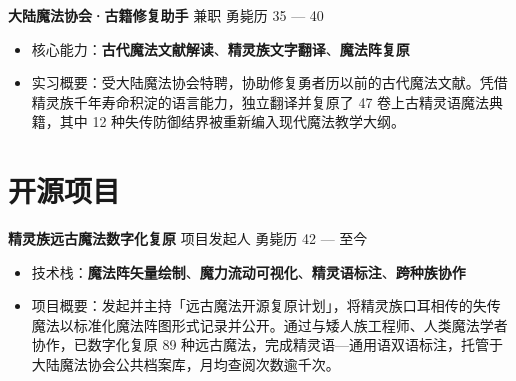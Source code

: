 \documentclass[11pt,a4paper]{article}
\newcommand*{\boldtext}[1]{{\bfseries #1}}
\newcommand{\globalIconSize}{12pt}
\newcommand{\secicon}[1]{{\color{globalIconColor}\fontsize{\globalIconSize}{\globalIconSize}\selectfont #1}}
\begin{document}
\vspace{0.8em}
\boldtext{大陆魔法协会·古籍修复助手} \hfill 兼职 \hfill 勇毙历 35 — 40
\begin{itemize}
    \item 核心能力：\boldtext{古代魔法文献解读}、\boldtext{精灵族文字翻译}、\boldtext{魔法阵复原}
    \item 实习概要：受大陆魔法协会特聘，协助修复勇者历以前的古代魔法文献。凭借精灵族千年寿命积淀的语言能力，独立翻译并复原了 47 卷上古精灵语魔法典籍，其中 12 种失传防御结界被重新编入现代魔法教学大纲。
\end{itemize}

\section{\secicon{\faCodeBranch}\hspace{0.5em}开源项目}
\boldtext{精灵族远古魔法数字化复原} \hfill 项目发起人 \hfill 勇毙历 42 — 至今
\begin{itemize}
    \item 技术栈：\boldtext{魔法阵矢量绘制}、\boldtext{魔力流动可视化}、\boldtext{精灵语标注}、\boldtext{跨种族协作}
    \item 项目概要：发起并主持「远古魔法开源复原计划」，将精灵族口耳相传的失传魔法以标准化魔法阵图形式记录并公开。通过与矮人族工程师、人类魔法学者协作，已数字化复原 89 种远古魔法，完成精灵语—通用语双语标注，托管于大陆魔法协会公共档案库，月均查阅次数逾千次。
\end{itemize}
\end{document}
